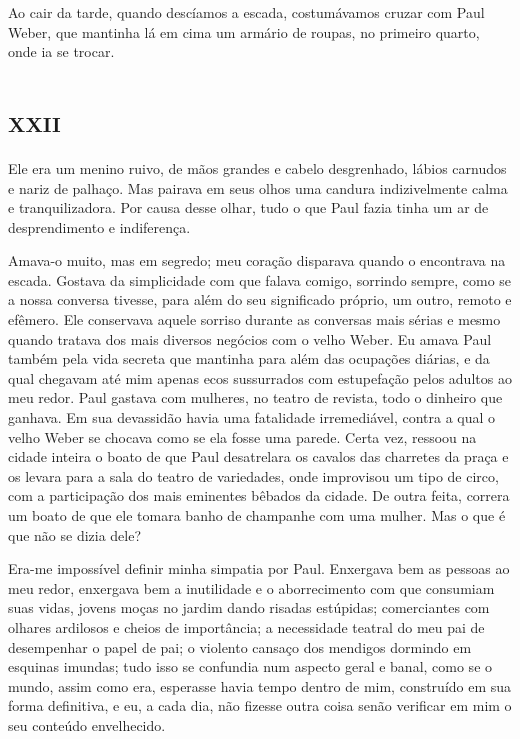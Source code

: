 Ao cair da tarde, quando descíamos a escada, costumávamos cruzar com Paul Weber, que mantinha lá em cima um armário de roupas, no primeiro quarto, onde ia se trocar.


\chapter*{\huge\centering\textsc{xxii}}

Ele era um menino ruivo, de mãos grandes e cabelo desgrenhado, lábios carnudos e nariz de palhaço. Mas pairava em seus olhos uma candura indizivelmente calma e tranquilizadora. Por causa desse olhar, tudo o que Paul fazia tinha um ar de desprendimento e indiferença.

Amava-o muito, mas em segredo; meu coração disparava quando o encontrava na escada. Gostava da simplicidade com que falava comigo, sorrindo sempre, como se a nossa conversa tivesse, para além do seu significado próprio, um outro, remoto e efêmero. Ele conservava aquele sorriso durante as conversas mais sérias e mesmo quando tratava dos mais diversos negócios com o velho Weber. Eu amava Paul também pela vida secreta que mantinha para além das ocupações diárias, e da qual chegavam até mim apenas ecos sussurrados com estupefação pelos adultos ao meu redor. Paul gastava com mulheres, no teatro de revista, todo o dinheiro que ganhava. Em sua devassidão havia uma fatalidade irremediável, contra a qual o velho Weber se chocava como se ela fosse uma parede. Certa vez, ressoou na cidade inteira o boato de que Paul desatrelara os cavalos das charretes da praça e os levara para a sala do teatro de variedades, onde improvisou um tipo de circo, com a participação dos mais eminentes bêbados da cidade. De outra feita, correra um boato de que ele tomara banho de champanhe com uma mulher. Mas o que é que não se dizia dele? 

Era-me impossível definir minha simpatia por Paul. Enxergava bem as pessoas ao meu redor, enxergava bem a inutilidade e o aborrecimento com que consumiam suas vidas, jovens moças no jardim dando risadas estúpidas; comerciantes com olhares ardilosos e cheios de importância; a necessidade teatral do meu pai de desempenhar o papel de pai; o violento cansaço dos mendigos dormindo em esquinas imundas; tudo isso se confundia num aspecto geral e banal, como se o mundo, assim como era, esperasse havia tempo dentro de mim, construído em sua forma definitiva, e eu, a cada dia, não fizesse outra coisa senão verificar em mim o seu conteúdo envelhecido.

